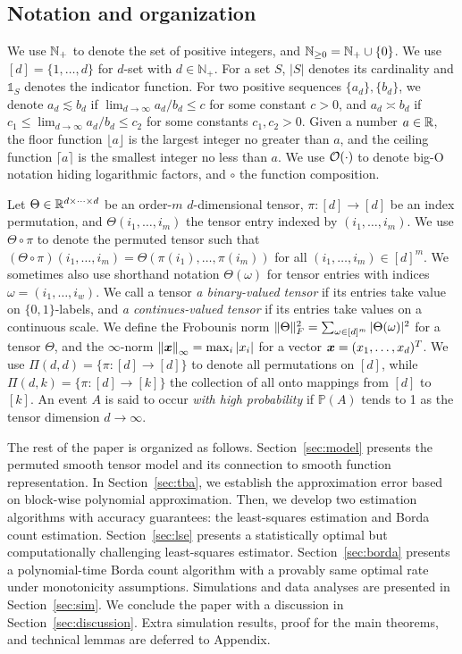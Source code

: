 \documentclass[11pt]{article}
\theoremstyle{definition}
\begin{document}
\subsection{Notation and organization}
We use $\mathbb{N}_{+}$ to denote the set of positive integers, and $\mathbb{N}_{\geq 0}=\mathbb{N}_{+}\cup\{0\}$.
We use $[d]=\{1,\ldots,d\}$ for $d$-set with $d\in\mathbb{N}_{+}$. For a set $S$, $|S|$ denotes its cardinality and $\mathds{1}_S$ denotes the indicator function. For two positive sequences $\{a_d\},\{b_d\}$,  we denote $a_d\lesssim b_d$ if $\lim_{d\to\infty} a_d/b_d\leq c$ for some constant $c>0$, and $a_d\asymp b_d$ if $c_1\leq \lim_{d\to \infty} a_d/b_d\leq c_2$ for some constants $c_1,c_2>0$. Given a number $a\in\mathbb{R}$, the floor function $\lfloor a\rfloor$ is the largest integer no greater than $a$, and the ceiling function $\lceil a\rceil$ is the smallest integer no less than $a$. We use $\mathcal{O}(\cdot)$ to denote big-O notation hiding logarithmic factors, and $\circ$ the function composition. 

Let $\Theta\in\mathbb{R}^{d\times \cdots \times d}$ be an order-$m$ $d$-dimensional tensor, $\pi\colon[d]\rightarrow[d]$ be an index permutation, and $\Theta(i_1,\ldots,i_m)$ the tensor entry indexed by $(i_1,\ldots,i_m)$. We use $\Theta\circ\pi$ to denote the permuted tensor such that $(\Theta\circ\pi)(i_1,\ldots,i_m) = \Theta(\pi(i_1),\ldots,\pi(i_m))$ for all $(i_1,\ldots,i_m)\in[d]^m$. We sometimes also use shorthand notation $\Theta(\omega)$ for tensor entries with indices $\omega=(i_1,\ldots,i_w)$. We call a tensor \emph{a binary-valued tensor} if its entries take value on $\{0,1\}$-labels, and \emph{a continues-valued tensor} if its entries take values on a continuous scale. We define the Frobounis norm $\lVert\Theta\rVert_F^2=\sum_{\omega\in[d]^m}|\Theta(\omega)|^2$ for a tensor $\Theta$, and the $\infty$-norm $\left\lVert\bm x\right\rVert_\infty=\max_{i}|x_i|$ for a vector $\bm x=(x_1,\ldots,x_d)^T$.
We use $\Pi(d,d)=\{\pi\colon [d]\to[d]\}$ to denote all permutations on $[d]$, while $\Pi(d,k)=\{\pi\colon [d]\to[k]\}$ the collection of all onto mappings from $[d]$ to $[k]$. An event $A$ is said to occur \emph{with high probability} if $\mathbb{P}(A)$ tends to 1 as the tensor dimension $d\to\infty$. 


The rest of the paper is organized as follows. Section~\ref{sec:model} presents the permuted smooth tensor model and its connection to smooth function representation. In Section~\ref{sec:tba}, we establish the approximation error based on block-wise polynomial approximation. Then, we develop two estimation algorithms with accuracy guarantees: the least-squares estimation and Borda count estimation. Section~\ref{sec:lse} presents a statistically optimal but computationally challenging least-squares estimator. Section~\ref{sec:borda} presents a polynomial-time Borda count algorithm with a provably same optimal rate under monotonicity assumptions. Simulations and data analyses are presented in Section~\ref{sec:sim}.  We conclude the paper with a discussion in Section~\ref{sec:discussion}. Extra simulation results, proof for the main theorems, and technical lemmas are deferred to Appendix. 
\end{document}
